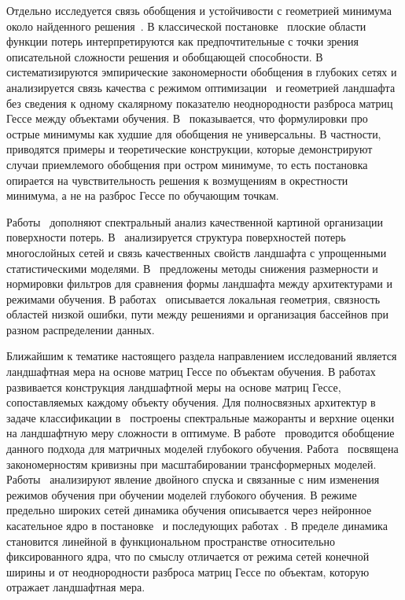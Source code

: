 Отдельно исследуется связь обобщения и устойчивости с геометрией минимума около найденного решения~\cite{hochreiter1997flat, neyshabur2017exploring, dinh2017sharp}.
В классической постановке~\cite{hochreiter1997flat} плоские области функции потерь интерпретируются как предпочтительные с точки зрения описательной сложности решения и обобщающей способности.
В~\cite{neyshabur2017exploring} систематизируются эмпирические закономерности обобщения в глубоких сетях и анализируется связь качества с режимом оптимизации~\cite{hochreiter1997flat} и геометрией ландшафта без сведения к одному скалярному показателю неоднородности разброса матриц Гессе между объектами обучения.
В~\cite{dinh2017sharp} показывается, что формулировки про острые минимумы как худшие для обобщения не универсальны.
В частности, приводятся примеры и теоретические конструкции, которые демонстрируют случаи приемлемого обобщения при остром минимуме, то есть постановка опирается на чувствительность решения к возмущениям в окрестности минимума, а не на разброс Гессе по обучающим точкам.

Работы~\cite{choromanska2015, li2018visualizing, fort2019emergent, fort2019large} дополняют спектральный анализ качественной картиной организации поверхности потерь.
В~\cite{choromanska2015} анализируется структура поверхностей потерь многослойных сетей и связь качественных свойств ландшафта с упрощенными статистическими моделями.
В~\cite{li2018visualizing} предложены методы снижения размерности и нормировки фильтров для сравнения формы ландшафта между архитектурами и режимами обучения.
В работах~\cite{fort2019emergent, fort2019large} описывается локальная геометрия, связность областей низкой ошибки, пути между решениями и организация бассейнов при разном распределении данных.

Ближайшим к тематике настоящего раздела направлением исследований является ландшафтная мера на основе матриц Гессе по объектам обучения.
В работах~\cite{grabovoi2024unraveling748584228, grabovoi2024convnets743111032} развивается конструкция ландшафтной меры на основе матриц Гессе, сопоставляемых каждому объекту обучения.
Для полносвязных архитектур в задаче классификации в~\cite{grabovoi2024unraveling748584228} построены спектральные мажоранты и верхние оценки на ландшафтную меру сложности в оптимуме.
В работе~\cite{grabovoi2024convnets743111032} проводится обобщение данного подхода для матричных моделей глубокого обучения.
Работа~\cite{petrov2025curvaturegap} посвящена закономерностям кривизны при масштабировании трансформерных моделей.
Работы~\cite{singh2024lmc, singh2022double} анализируют явление двойного спуска и связанные с ним изменения режимов обучения при обучении моделей глубокого обучения.
В режиме предельно широких сетей динамика обучения описывается через нейронное касательное ядро в постановке~\cite{NEURIPS2018_5a4be1fa} и последующих работах~\cite{lee2018wide}.
В пределе динамика становится линейной в функциональном пространстве относительно фиксированного ядра, что по смыслу отличается от режима сетей конечной ширины и от неоднородности разброса матриц Гессе по объектам, которую отражает ландшафтная мера.

